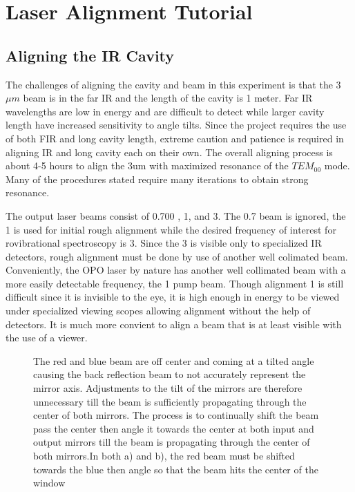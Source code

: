 \documentclass[a4paper]{book}
\begin{document}
\chapter{Laser Alignment Tutorial}
\section{Aligning the IR Cavity}
\label{sec:Aligning the IR Cavity}
The challenges of aligning the cavity and beam in this experiment is that the 3$\mu m$ beam is in the far IR and the length of the cavity is 1 meter. Far IR wavelengths are low in energy and are difficult to detect while larger cavity length have increased sensitivity to angle tilts. Since the project requires the use of both  FIR and long cavity length, extreme caution and patience is required in aligning IR and long cavity each on their own. The overall aligning process is about 4-5 hours to align the 3um with maximized resonance of the $TEM_{00}$ mode. Many of the procedures stated require many iterations to obtain strong resonance.

The output laser beams consist of 0.700 , 1, and 3. The 0.7 beam is ignored, the 1 is used for initial rough alignment while the desired frequency of interest for rovibrational spectroscopy is 3. 
Since the 3 is visible only to specialized IR detectors, rough alignment must be done by use of another well colimated beam. Conveniently, the OPO laser by nature has another well collimated beam with a more easily detectable frequency, the 1 pump beam. Though alignment 1 is still difficult since it is invisible to the eye, it is high enough in energy to be viewed under specialized viewing scopes allowing alignment without the help of detectors. It is much more convient to align a beam that is at least visible with the use of a viewer.

\begin{figure} [!ht]
	\centering
	\def\svgwidth{\columnwidth}
	\resizebox{130mm}{!}{}
	\caption{The red and blue beam are off center and coming at a tilted angle causing the back reflection beam to not accurately represent the mirror axis. Adjustments to the tilt of the mirrors are therefore unnecessary till the beam is sufficiently propagating through the center of both mirrors. 
		The process is to continually shift the beam pass the center then angle it towards the center at both input and output mirrors till the beam is propagating through the center of both mirrors.In both a) and b), the red beam must be shifted towards the blue then angle so that the beam hits the center of the window}
	\label{fig:cav-align-improper}
\end{figure}
\end{document}
